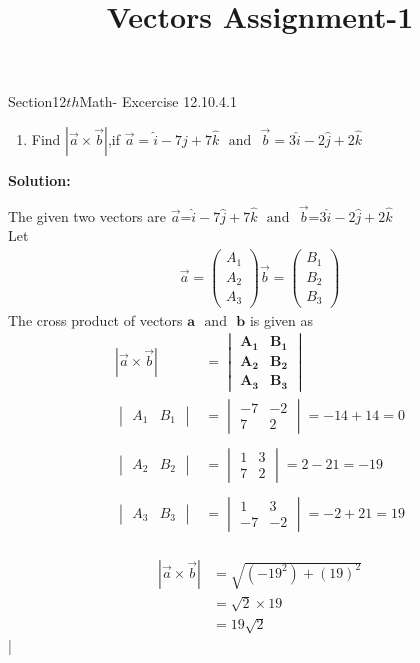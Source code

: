 \documentclass[12pt]{article}
\newcommand{\mydet}[1]{\ensuremath{\begin{vmatrix}#1\end{vmatrix}}}
\providecommand{\abs}[1]{\left\vert#1\right\vert}
\newcommand{\solution}{\noindent \textbf{Solution: }}
\newcommand{\myvec}[1]{\ensuremath{\begin{pmatrix}#1\end{pmatrix}}}
\let\vec\mathbf
\begin{document}
\begin{center}\title{\textbf{Vectors Assignment-1}}
\date{\vspace{-5ex}}
\maketitle
\end{center}
Section{12${th}$Math- Excercise 12.10.4.1}

\begin{enumerate}
\item Find $\abs{\overrightarrow{a}\times\overrightarrow{b}}$,if $\overrightarrow{a}=\hat{i}-7\hat{j}+7\hat{k}$ $\text{ and } $ $\overrightarrow{b}=3\hat{i}-2\hat{j}+2\hat{k}$
\end{enumerate}

\solution

The given two vectors are $\overrightarrow{a}$=$\hat{i}-7\hat{j}+7\hat{k}$  $\text{ and }$  $\overrightarrow{b}$=3$\hat{i}-2\hat{j}+2\hat{k}$ \\
 Let 
	\begin{align}
		\overrightarrow{a}=\myvec{A_1\\A_2\\A_3}
		\overrightarrow{b}=\myvec{B_1\\B_2\\B_3}
	\end{align}
The cross product of vectors $\vec{a}$ $\text{ and }$ $\vec{b}$ is given as
\begin{align}
	\abs{\overrightarrow{a}\times\overrightarrow{b}}&=\mydet{\vec{A_1}& \vec{B_1} \\ \vec{A_2} & \vec{B_2} \\\vec{A_3} & \vec{B_3}}\\
\mydet{A_1&B_1}&=\mydet{-7 & -2 \\ 7 & 2}=-14+14=0\\\\
\mydet{A_2&B_2}&=\mydet{1 & 3 \\ 7 & 2}=2-21=-19\\\\
\mydet{A_3&B_3}&=\mydet{1 & 3 \\ -7 & -2}=-2+21=19\\
\end{align}

\begin{align}
	\abs{\overrightarrow{a}\times\overrightarrow{b}}&=\sqrt{(-19^2)+(19)^2}\\
&=\sqrt{2}\times19\\
&=19\sqrt{2}
\end{align}|
\end{document}
